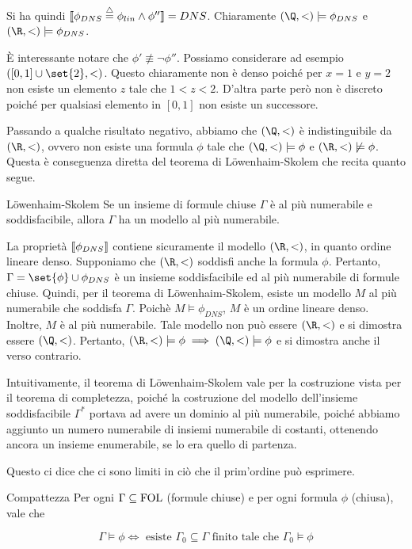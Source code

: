 Si ha quindi \(\den{\phi_{DNS} \eqdef\phi_{lin} \land \phi''} = DNS\). Chiaramente \((\Q,<)\models \phi_{DNS}\) e \((\R,<)\models \phi_{DNS}\).

È interessante notare che \(\phi'\not\equiv\neg \phi''\). Possiamo considerare ad esempio \(([0,1]\cup \set{2},<)\). Questo chiaramente non è denso poiché per \(x = 1\) e \(y = 2\) non esiste un elemento \(z\) tale che \(1 < z < 2\). D'altra parte però non è discreto poiché per qualsiasi elemento in \([0,1]\) non esiste un successore. 

Passando a qualche risultato negativo, abbiamo che \((\Q,<)\) è indistinguibile da \((\R,<)\), ovvero non esiste una formula \(\phi\) tale che \((\Q,<)\models \phi\) e \((\R,<)\not\models \phi\). Questa è conseguenza diretta del teorema di Löwenhaim-Skolem che recita quanto segue.
\begin{theorem}{Löwenhaim-Skolem}
  Se un insieme di formule chiuse \(\Gamma\) è al più numerabile e soddisfacibile, allora \(\Gamma\) ha un modello al più numerabile.
\end{theorem}

La proprietà \(\den{\phi_{DNS}}\) contiene sicuramente il modello \((\R,<)\), in quanto ordine lineare denso. Supponiamo che \((\R,<)\) soddisfi anche la formula \(\phi\). Pertanto, \(\Gamma = \set{\phi} \cup \phi_{DNS}\) è un insieme soddisfacibile ed al più numerabile di formule chiuse. Quindi, per il teorema di Löwenhaim-Skolem, esiste un modello \(M\) al più numerabile che soddisfa \(\Gamma\). Poichè \(M\models \phi_{DNS}\), \(M\) è un ordine lineare denso. Inoltre, \(M\) è al più numerabile. Tale modello non può essere \((\R,<)\) e si dimostra essere \((\Q, <)\).
Pertanto, \((\R, <)\models \phi \implies (\Q, <)\models \phi\) e si dimostra anche il verso contrario.

Intuitivamente, il teorema di Löwenhaim-Skolem vale per la costruzione vista per il teorema di completezza, poiché la costruzione del modello dell'insieme soddisfacibile \(\Gamma^*\) portava ad avere un dominio al più numerabile, poiché abbiamo aggiunto un numero numerabile di insiemi numerabile di costanti, ottenendo ancora un insieme enumerabile, se lo era quello di partenza.

Questo ci dice che ci sono limiti in ciò che il prim'ordine può esprimere.

\begin{theorem}{Compattezza}
  Per ogni \(\Gamma\subseteq\FOL\) (formule chiuse) e per ogni formula \(\phi\) (chiusa), vale che
  
  \[\Gamma \models \phi \iff \text{ esiste } \Gamma_0 \subseteq \Gamma \text{ finito tale che } \Gamma_0 \models \phi\]
\end{theorem}

